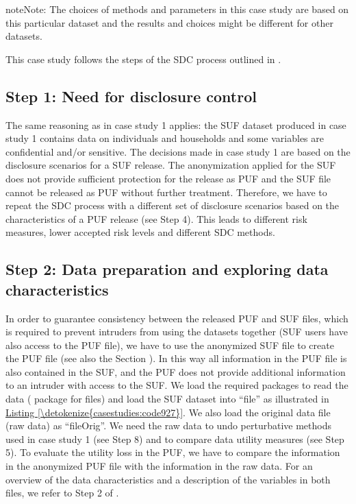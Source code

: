 \documentclass[letterpaper,10pt,english]{sphinxmanual}
\begin{document}
\begin{sphinxadmonition}{note}{Note:}
The choices of methods and parameters in this case study are based on this particular dataset and the results and
choices might be different for other datasets.
\end{sphinxadmonition}

This case study follows the steps of the SDC process outlined in
.


\subsection{Step 1: Need for disclosure control}
\label{\detokenize{casestudies:id6}}
The same reasoning as in case study 1 applies: the SUF dataset produced
in case study 1 contains data on individuals and households and some
variables are confidential and/or sensitive. The decisions made in case
study 1 are based on the disclosure scenarios for a SUF release. The
anonymization applied for the SUF does not provide sufficient protection
for the release as PUF and the SUF file cannot be released as PUF
without further treatment. Therefore, we have to repeat the SDC process
with a different set of disclosure scenarios based on the
characteristics of a PUF release (see Step 4). This leads to different
risk measures, lower accepted risk levels and different SDC methods.


\subsection{Step 2: Data preparation and exploring data characteristics}
\label{\detokenize{casestudies:id7}}
In order to guarantee consistency between the released PUF and SUF
files, which is required to prevent intruders from using the datasets
together (SUF users have also access to the PUF file), we have to use
the anonymized SUF file to create the PUF file (see also the Section
).
In this way all information in the PUF file is also contained in the
SUF, and the PUF does not provide additional information to an intruder
with access to the SUF. We load the required packages to read the data
( package for  files) and load the SUF dataset into
“file” as illustrated in \hyperref[\detokenize{casestudies:code927}]{Listing \ref{\detokenize{casestudies:code927}}}. We also load the original data
file (raw data) as “fileOrig”. We need the raw data to undo perturbative
methods used in case study 1 (see Step 8) and to compare data utility
measures (see Step 5). To evaluate the utility loss in the PUF, we have
to compare the information in the anonymized PUF file with the
information in the raw data. For an overview of the data characteristics
and a description of the variables in both files, we refer to Step 2 of
{\hyperref[\detokenize{casestudies:case-study-1-suf}]{}} .
\end{document}
